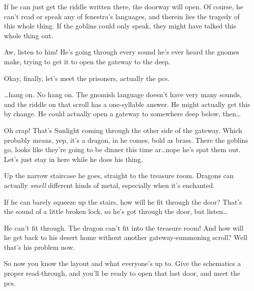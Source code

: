 \begin{multicols}{2}
\begin{exampletext}
If he can just get the riddle written there, the doorway will open.
Of course, he can't read or speak any of \gls{fenestra}'s languages, and therein lies the tragedy of this whole thing.
If the goblins could only speak, they might have talked this whole thing out.

Aw, listen to him!
He's going through every sound he's ever heard the gnomes make, trying to get it to open the gateway to the \gls{deep}.

Okay, finally, let's meet the prisoners, actually the \glspl{pc}.

\ldots hang on.
No hang on.
The gnomish language doesn't have very many sounds, and the riddle on that scroll has a one-syllable answer.
He might actually get this by change.
He could actually open a gateway to somewhere deep below, then\ldots

Oh crap!
That's Sunlight coming through the other side of the gateway.
Which probably means, yep, it's a dragon, in he comes, bold as brass.
There the goblins go, looks like they're going to be dinner this time ar\ldots nope he's spat them out.
Let's just stay in here while he does his thing.

Up the narrow staircase he goes, straight to the treasure room.
Dragons can actually \emph{smell} different kinds of metal, especially when it's enchanted.

If he can barely squeeze up the stairs, how will he fit through the door?
That's the sound of a little broken lock, so he's got through the door, but listen\ldots
{}

He can't fit through.
The dragon can't fit into the treasure room!
And how will he get back to his desert home without another gateway-summoning scroll?
Well that's his problem now.

So now you know the layout and what everyone's up to.
Give the schematics a proper read-through, and you'll be ready to open that last door, and meet the \glspl{pc}.

\end{exampletext}
\end{multicols}
